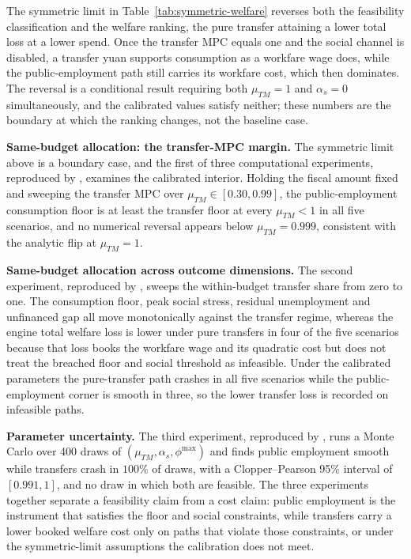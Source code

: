 \documentclass[review,12pt]{elsarticle}
\theoremstyle{plain}
\theoremstyle{definition}
\theoremstyle{remark}
\begin{document}
\noindent The symmetric limit in Table~\ref{tab:symmetric-welfare} reverses both the feasibility classification and the welfare ranking, the pure transfer attaining a lower total loss at a lower spend. Once the transfer MPC equals one and the social channel is disabled, a transfer yuan supports consumption as a workfare wage does, while the public-employment path still carries its workfare cost, which then dominates. The reversal is a conditional result requiring both $\mu_{TM}=1$ and $\alpha_s=0$ simultaneously, and the calibrated values satisfy neither; these numbers are the boundary at which the ranking changes, not the baseline case.

\smallskip\noindent\textbf{Same-budget allocation: the transfer-MPC margin.} The symmetric limit above is a boundary case, and the first of three computational experiments, reproduced by , examines the calibrated interior. Holding the fiscal amount fixed and sweeping the transfer MPC over $\mu_{TM}\in[0.30,0.99]$, the public-employment consumption floor is at least the transfer floor at every $\mu_{TM}<1$ in all five scenarios, and no numerical reversal appears below $\mu_{TM}=0.999$, consistent with the analytic flip at $\mu_{TM}=1$.

\smallskip\noindent\textbf{Same-budget allocation across outcome dimensions.} The second experiment, reproduced by , sweeps the within-budget transfer share from zero to one. The consumption floor, peak social stress, residual unemployment and unfinanced gap all move monotonically against the transfer regime, whereas the engine total welfare loss is lower under pure transfers in four of the five scenarios because that loss books the workfare wage and its quadratic cost but does not treat the breached floor and social threshold as infeasible. Under the calibrated parameters the pure-transfer path crashes in all five scenarios while the public-employment corner is smooth in three, so the lower transfer loss is recorded on infeasible paths.

\smallskip\noindent\textbf{Parameter uncertainty.} The third experiment, reproduced by , runs a Monte Carlo over 400 draws of $(\mu_{TM},\alpha_s,\phi^{\max})$ and finds public employment smooth while transfers crash in $100\%$ of draws, with a Clopper--Pearson 95\% interval of $[0.991,1]$, and no draw in which both are feasible. The three experiments together separate a feasibility claim from a cost claim: public employment is the instrument that satisfies the floor and social constraints, while transfers carry a lower booked welfare cost only on paths that violate those constraints, or under the symmetric-limit assumptions the calibration does not meet.
\end{document}

